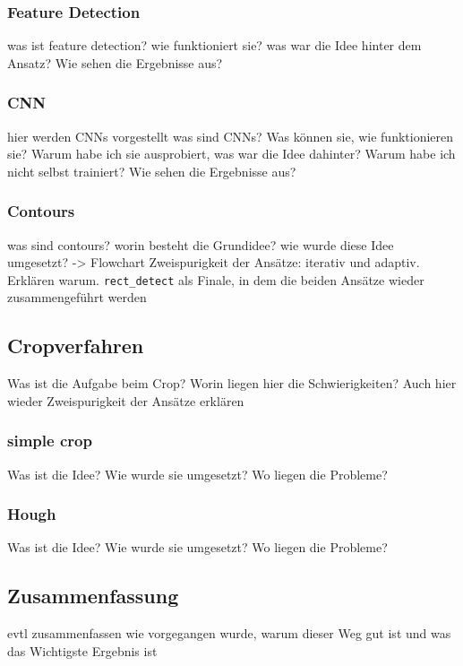 
\subsubsection{Feature Detection}

was ist feature detection?
wie funktioniert sie?
was war die Idee hinter dem Ansatz?
Wie sehen die Ergebnisse aus?

\subsubsection{CNN}

hier werden CNNs vorgestellt
was sind CNNs?
Was können sie, wie funktionieren sie?
Warum habe ich sie ausprobiert, was war die Idee dahinter?
Warum habe ich nicht selbst trainiert?
Wie sehen die Ergebnisse aus?

\subsubsection{Contours}

was sind contours?
worin besteht die Grundidee?
wie wurde diese Idee umgesetzt? -> Flowchart
Zweispurigkeit der Ansätze: iterativ und adaptiv. Erklären warum.
\verb|rect_detect| als Finale, in dem die beiden Ansätze wieder zusammengeführt werden

\subsection{Cropverfahren}

Was ist die Aufgabe beim Crop?
Worin liegen hier die Schwierigkeiten?
Auch hier wieder Zweispurigkeit der Ansätze erklären

\subsubsection{simple crop}

Was ist die Idee?
Wie wurde sie umgesetzt?
Wo liegen die Probleme?

\subsubsection{Hough}

Was ist die Idee?
Wie wurde sie umgesetzt?
Wo liegen die Probleme?

\subsection{Zusammenfassung}
evtl zusammenfassen wie vorgegangen wurde, warum dieser Weg gut ist und was das Wichtigste Ergebnis ist